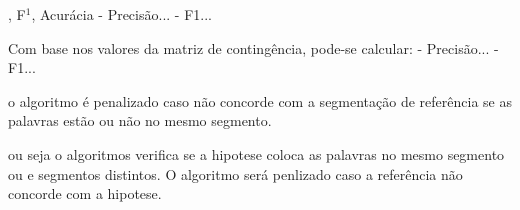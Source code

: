 , F$^1$, Acurácia
- Precisão...
- F1...

















Com base nos valores da matriz de contingência, pode-se calcular:
- Precisão...
- F1...











o algoritmo é penalizado caso não concorde com a segmentação de referência se as palavras estão ou não no mesmo segmento. 



ou seja o algoritmos verifica se a hipotese coloca as palavras no mesmo segmento ou e segmentos distintos. O algoritmo será penlizado caso a referência não concorde com a hipotese.




